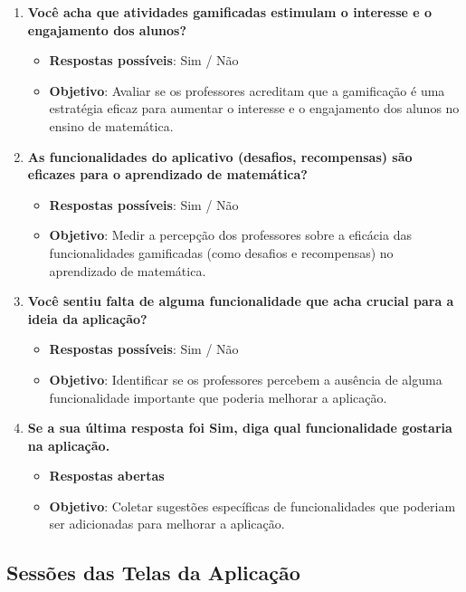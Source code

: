 \begin{enumerate}[label=\arabic*.]
    \item \textbf{Você acha que atividades gamificadas estimulam o interesse e o engajamento dos alunos?}
    \begin{itemize}
        \item \textbf{Respostas possíveis}: Sim / Não
        \item \textbf{Objetivo}: Avaliar se os professores acreditam que a gamificação é uma estratégia eficaz para aumentar o interesse e o engajamento dos alunos no ensino de matemática.
    \end{itemize}
    
    \item \textbf{As funcionalidades do aplicativo (desafios, recompensas) são eficazes para o aprendizado de matemática?}
    \begin{itemize}
        \item \textbf{Respostas possíveis}: Sim / Não
        \item \textbf{Objetivo}: Medir a percepção dos professores sobre a eficácia das funcionalidades gamificadas (como desafios e recompensas) no aprendizado de matemática.
    \end{itemize}
    
    \item \textbf{Você sentiu falta de alguma funcionalidade que acha crucial para a ideia da aplicação?}
    \begin{itemize}
        \item \textbf{Respostas possíveis}: Sim / Não
        \item \textbf{Objetivo}: Identificar se os professores percebem a ausência de alguma funcionalidade importante que poderia melhorar a aplicação.
    \end{itemize}
    
    \item \textbf{Se a sua última resposta foi Sim, diga qual funcionalidade gostaria na aplicação.}
    \begin{itemize}
        \item \textbf{Respostas abertas}
        \item \textbf{Objetivo}: Coletar sugestões específicas de funcionalidades que poderiam ser adicionadas para melhorar a aplicação.
    \end{itemize}
\end{enumerate}

\subsection{Sessões das Telas da Aplicação}

